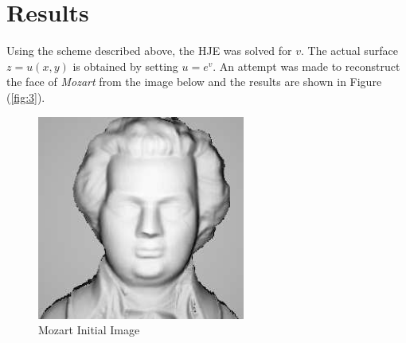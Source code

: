 \documentclass[11pt]{report}
\begin{document}
	\section{Results}
	Using the scheme described above, the HJE was solved for $v$. The actual surface $z = u(x,y)$ is obtained by setting $u =  e^v$. An attempt was made to reconstruct the face of \textit{Mozart} from the image below and the results are shown in Figure (\ref{fig:3}). \\
	\begin{figure}[h!]
		\centering
		\includegraphics[scale=1]{moz.png}
		\caption{Mozart Initial Image}
		\label{fig:2}
	\end{figure}
	
\end{document}

